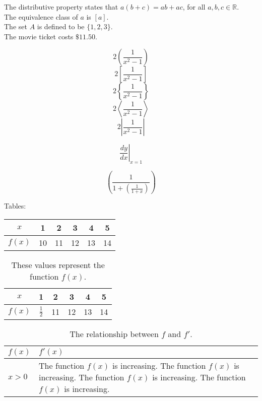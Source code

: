 \documentclass[11pt]{article}
\begin{document}

The distributive property states that $a(b+c)=ab+ac$, for all $a, b, c \in \mathbb{R}$.\\[6pt]
The equivalence class of $a$ is $[a]$.\\[6pt]
The set $A$ is defined to be $\{1, 2, 3\}$.\\[6pt]
The movie ticket costs $\$11.50$.

$$2\left(\frac{1}{x^2 - 1}\right)$$
$$2\left[\frac{1}{x^2 - 1}\right]$$
$$2\left\{\frac{1}{x^2 - 1}\right\}$$
$$2\left \langle   \frac{1}{x^2 - 1}   \right \rangle$$
$$2\left | \frac{1}{x^2 - 1} \right |$$

$$\left.\frac{dy}{dx}\right|_{x=1}$$

$$\left( \frac{1}{1+\left(\frac{1}{1 + x}\right)} \right)$$

Tables: \\


\begin{tabular}{|c|c|c|c|c|c|}
\hline
$x$ & 1 & 2 & 3 & 4 & 5 \\ \hline
$f(x)$ & 10 & 11 & 12 & 13 & 14 \\ \hline
\end{tabular}

\vspace{1cm}

\begin{table}[H]
\centering
\def\arraystretch{1.5}
\begin{tabular}{|c||c|c|c|c|c|}

\hline
$x$ & 1 & 2 & 3 & 4 & 5 \\ \hline
$f(x)$ & $\frac{1}{2}$ & 11 & 12 & 13 & 14 \\ \hline

\end{tabular}
\caption{These values represent the function $f(x)$.}
\end{table}


\begin{table}[H]
\centering
\caption{The relationship between $f$ and $f'$.}
\def\arraystretch{1.5}
\begin{tabular}{|l|p{3in}|}

\hline
$f(x)$ & $f'(x)$ \\ \hline
$x > 0$ & The function $f(x)$ is increasing. The function $f(x)$ is increasing. The function $f(x)$ is increasing. The function $f(x)$ is increasing. \\ \hline

\end{tabular}
\end{table}
\end{document}
